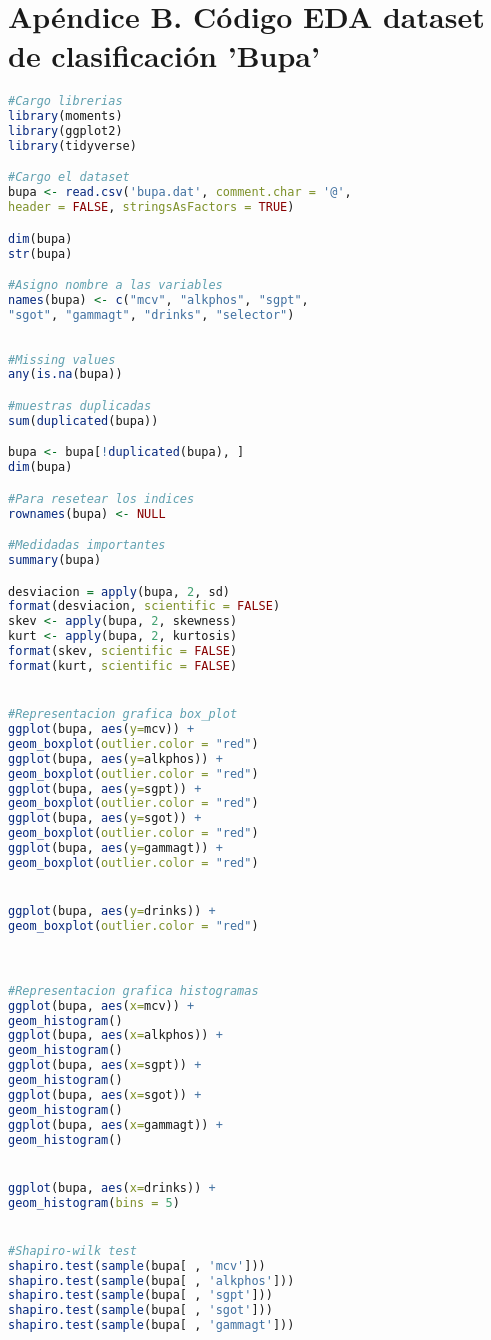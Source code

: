\section{Apéndice B. Código EDA dataset de clasificación 'Bupa'}

\begin{lstlisting}[language=R]
#Cargo librerias
library(moments)
library(ggplot2)
library(tidyverse)

#Cargo el dataset
bupa <- read.csv('bupa.dat', comment.char = '@', 
header = FALSE, stringsAsFactors = TRUE)

dim(bupa)
str(bupa)

#Asigno nombre a las variables
names(bupa) <- c("mcv", "alkphos", "sgpt",
"sgot", "gammagt", "drinks", "selector")
	
	
#Missing values
any(is.na(bupa))

#muestras duplicadas
sum(duplicated(bupa))

bupa <- bupa[!duplicated(bupa), ]
dim(bupa)

#Para resetear los indices
rownames(bupa) <- NULL

#Medidadas importantes
summary(bupa)

desviacion = apply(bupa, 2, sd)
format(desviacion, scientific = FALSE)
skev <- apply(bupa, 2, skewness)
kurt <- apply(bupa, 2, kurtosis)
format(skev, scientific = FALSE)
format(kurt, scientific = FALSE)


#Representacion grafica box_plot
ggplot(bupa, aes(y=mcv)) +
geom_boxplot(outlier.color = "red")
ggplot(bupa, aes(y=alkphos)) +
geom_boxplot(outlier.color = "red")
ggplot(bupa, aes(y=sgpt)) +
geom_boxplot(outlier.color = "red")
ggplot(bupa, aes(y=sgot)) +
geom_boxplot(outlier.color = "red")
ggplot(bupa, aes(y=gammagt)) +
geom_boxplot(outlier.color = "red")


ggplot(bupa, aes(y=drinks)) +
geom_boxplot(outlier.color = "red")



#Representacion grafica histogramas
ggplot(bupa, aes(x=mcv)) +
geom_histogram()
ggplot(bupa, aes(x=alkphos)) +
geom_histogram()
ggplot(bupa, aes(x=sgpt)) +
geom_histogram()
ggplot(bupa, aes(x=sgot)) +
geom_histogram()
ggplot(bupa, aes(x=gammagt)) +
geom_histogram()


ggplot(bupa, aes(x=drinks)) +
geom_histogram(bins = 5)


#Shapiro-wilk test
shapiro.test(sample(bupa[ , 'mcv']))
shapiro.test(sample(bupa[ , 'alkphos']))
shapiro.test(sample(bupa[ , 'sgpt']))
shapiro.test(sample(bupa[ , 'sgot']))
shapiro.test(sample(bupa[ , 'gammagt']))




\end{lstlisting}
